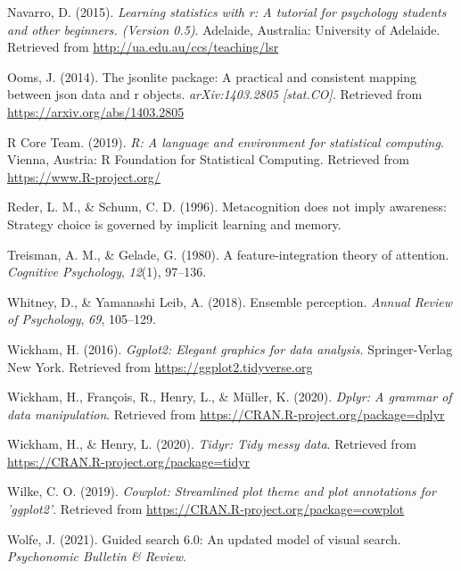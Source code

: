 \documentclass[
  english,
  man]{apa6}
\begin{document}
\leavevmode\hypertarget{ref-R-lsr}{}%
Navarro, D. (2015). \emph{Learning statistics with r: A tutorial for psychology students and other beginners. (Version 0.5)}. Adelaide, Australia: University of Adelaide. Retrieved from \url{http://ua.edu.au/ccs/teaching/lsr}

\leavevmode\hypertarget{ref-R-jsonlite}{}%
Ooms, J. (2014). The jsonlite package: A practical and consistent mapping between json data and r objects. \emph{arXiv:1403.2805 {[}stat.CO{]}}. Retrieved from \url{https://arxiv.org/abs/1403.2805}

\leavevmode\hypertarget{ref-R-base}{}%
R Core Team. (2019). \emph{R: A language and environment for statistical computing}. Vienna, Austria: R Foundation for Statistical Computing. Retrieved from \url{https://www.R-project.org/}

\leavevmode\hypertarget{ref-reder1996metacognition}{}%
Reder, L. M., \& Schunn, C. D. (1996). Metacognition does not imply awareness: Strategy choice is governed by implicit learning and memory.

\leavevmode\hypertarget{ref-treisman1980feature}{}%
Treisman, A. M., \& Gelade, G. (1980). A feature-integration theory of attention. \emph{Cognitive Psychology}, \emph{12}(1), 97--136.

\leavevmode\hypertarget{ref-whitney2018ensemble}{}%
Whitney, D., \& Yamanashi Leib, A. (2018). Ensemble perception. \emph{Annual Review of Psychology}, \emph{69}, 105--129.

\leavevmode\hypertarget{ref-R-ggplot2}{}%
Wickham, H. (2016). \emph{Ggplot2: Elegant graphics for data analysis}. Springer-Verlag New York. Retrieved from \url{https://ggplot2.tidyverse.org}

\leavevmode\hypertarget{ref-R-dplyr}{}%
Wickham, H., François, R., Henry, L., \& Müller, K. (2020). \emph{Dplyr: A grammar of data manipulation}. Retrieved from \url{https://CRAN.R-project.org/package=dplyr}

\leavevmode\hypertarget{ref-R-tidyr}{}%
Wickham, H., \& Henry, L. (2020). \emph{Tidyr: Tidy messy data}. Retrieved from \url{https://CRAN.R-project.org/package=tidyr}

\leavevmode\hypertarget{ref-R-cowplot}{}%
Wilke, C. O. (2019). \emph{Cowplot: Streamlined plot theme and plot annotations for 'ggplot2'}. Retrieved from \url{https://CRAN.R-project.org/package=cowplot}

\leavevmode\hypertarget{ref-wolfe2021guided}{}%
Wolfe, J. (2021). Guided search 6.0: An updated model of visual search. \emph{Psychonomic Bulletin \& Review}.
\end{document}
